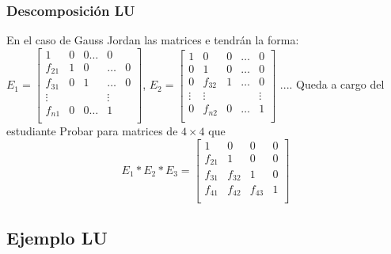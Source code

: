 \documentclass[xcolor=svgnames]{beamer} %
\theoremstyle{plain}
\theoremstyle{definition}
\begin{document}
\begin{frame}
\frametitle{Descomposición LU}
En el caso de Gauss Jordan las matrices e tendrán la forma:
$E_1 = \begin{bmatrix}
1 		&0 & 0 \dots & 0 \\
f_{21} 	&1 & 0 &\dots & 0 \\
f_{31} 	&0 & 1 &\dots & 0 \\
\vdots & & &  \vdots \\
f_{n1} 	&0 & 0 \dots & 1 \\
\end{bmatrix}$, $E_2 = \begin{bmatrix}
1 &0 		& 0 &\dots & 0 \\
0 &1 		& 0 &\dots & 0 \\
0 &f_{32} 	& 1 &\dots & 0 \\
\vdots & \vdots& 	&		&  \vdots \\
0 & f_{n2} & 0 & \dots & 1 \\
\end{bmatrix}$ ....
Queda a cargo del estudiante  Probar para matrices de $4\times4$ que 
$$ E_1*E_2*E_3 = \begin{bmatrix}
1 		& 0 		& 0 		& 0\\
f_{21} 	& 1 		& 0 		& 0\\
f_{31} 	& f_{32}	& 1 		& 0\\
f_{41} 	& f_{42}	& f_{43}	& 1\\
\end{bmatrix}$$

\end{frame}

\subsection{Ejemplo LU}
\end{document}
